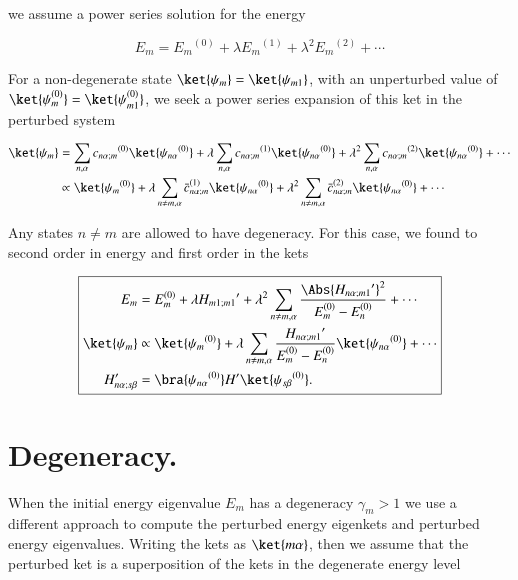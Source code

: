 we assume a power series solution for the energy

\begin{equation}\label{eqn:qmTwoReview:350}
E_m = {E_m}^{(0)} + \lambda {E_m}^{(1)} + \lambda^2 {E_m}^{(2)} + \cdots
\end{equation}

For a non-degenerate state $\ket{\psi_m} = \ket{\psi_{m1}}$, with an unperturbed value of $\ket{\psi_{m}^{(0)}} = \ket{\psi_{m1}^{(0)}}$, we seek a power series expansion of this ket in the perturbed system

\begin{equation}\label{eqn:qmTwoReview:130}
\begin{aligned}
\ket{\psi_m} &= 
\sum_{n,\alpha} {c_{n\alpha;m}}^{(0)} \ket{{\psi_{n\alpha}}^{(0)}} 
+
\lambda
\sum_{n,\alpha} {c_{n\alpha;m}}^{(1)} \ket{{\psi_{n\alpha}}^{(0)}} 
+ 
\lambda^2
\sum_{n,\alpha} {c_{n\alpha;m}}^{(2)} \ket{{\psi_{n\alpha}}^{(0)}} 
+ \cdots \\
&\propto
\ket{{\psi_m}^{(0)}} 
+ 
\lambda
\sum_{n \ne m, \alpha} {\bar{c}_{n\alpha;m}}^{(1)} \ket{{\psi_{n\alpha}}^{(0)}} 
+
\lambda^2
\sum_{n \ne m, \alpha} {\bar{c}_{n\alpha;m}}^{(2)} \ket{{\psi_{n\alpha}}^{(0)}} 
+ \cdots
\end{aligned}
\end{equation}

Any states $n \ne m$ are allowed to have degeneracy.  For this case, we found to second order in energy and first order in the kets

\begin{equation}\label{eqn:qmTwoReview:370}
\boxed{
\begin{aligned}
E_m &= E_m^{(0)} + \lambda {H_{m1;m1}}' + \lambda^2 
\sum_{n \ne m, \alpha} 
\frac{\Abs{{H_{n\alpha;m1}}'}^2 }
{ E_m^{(0)} - E_n^{(0)} } 
+ \cdots
\\
\ket{\psi_m} &\propto \ket{{\psi_m}^{(0)}} + \lambda
\sum_{n \ne m, \alpha} 
\frac{{H_{n\alpha;m1}}'}
{ E_m^{(0)} - E_n^{(0)} } \ket{{\psi_{n\alpha}}^{(0)}}
+ \cdots \\
H_{n\alpha;s\beta}' &=
\bra{{\psi_{n\alpha}}^{(0)}}
H'
\ket{{\psi_{s\beta}}^{(0)}}.
\end{aligned}
}
\end{equation}

\section{Degeneracy.}

When the initial energy eigenvalue $E_m$ has a degeneracy $\gamma_m > 1$ we use a different approach to compute the perturbed energy eigenkets and perturbed energy eigenvalues.  Writing the kets as $\ket{m\alpha}$, then we assume that the perturbed ket is a superposition of the kets in the degenerate energy level

